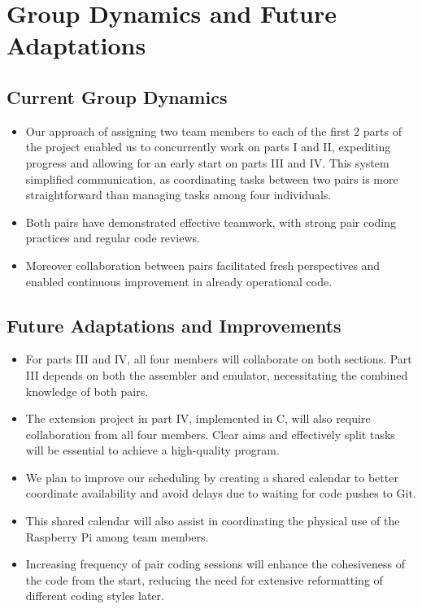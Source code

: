 \documentclass{article}
\begin{document}
\section{Group Dynamics and Future Adaptations}
\label{sec:group_dynamics}
\subsection{Current Group Dynamics}
\begin{itemize}
    \item Our approach of assigning two team members to each of the first 2 parts of the project enabled us to concurrently work on parts I and II, expediting progress and allowing for an early start on parts III and IV. This system simplified communication, as coordinating tasks between two pairs is more straightforward than managing tasks among four individuals.
    \item Both pairs have demonstrated effective teamwork, with strong pair coding practices and regular code reviews.
    \item Moreover collaboration between pairs facilitated fresh perspectives and enabled continuous improvement in already operational code.
\end{itemize}


\subsection{Future Adaptations and Improvements}
\begin{itemize}
    \item For parts III and IV, all four members will collaborate on both sections. Part III depends on both the assembler and emulator, necessitating the combined knowledge of both pairs.
    \item The extension project in part IV, implemented in C, will also require collaboration from all four members. Clear aims and effectively split tasks will be essential to achieve a high-quality program.
    \item We plan to improve our scheduling by creating a shared calendar to better coordinate availability and avoid delays due to waiting for code pushes to Git.
    \item This shared calendar will also assist in coordinating the physical use of the Raspberry Pi among team members.
    \item Increasing frequency of pair coding sessions will enhance the cohesiveness of the code from the start, reducing the need for extensive reformatting of different coding styles later.
\end{itemize}
\end{document}
